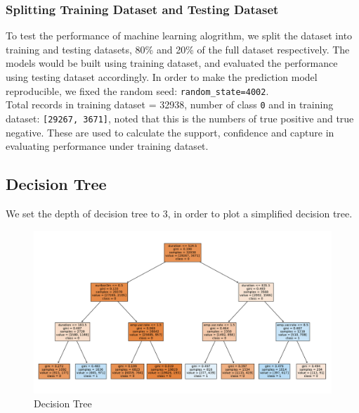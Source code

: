 \documentclass[11pt,a4paper]{article}
\begin{document}
    \subsubsection{Splitting Training Dataset and Testing Dataset}
    To test the performance of machine learning alogrithm, we split the dataset into training and testing datasets, 80\% and 20\% of the full dataset respectively. The models would be built using training dataset, and evaluated the performance using testing dataset accordingly. In order to make the prediction model reproducible, we fixed the random seed: \texttt{random\_state=4002}. \\
    Total records in training dataset = 32938, number of class \texttt{0} and  in training dataset: \texttt{[29267, 3671]}, noted that this is the numbers of true positive and true negative. These are used to calculate the support, confidence and capture in evaluating performance under training dataset.
    
    
    \newpage
    \subsection{Decision Tree} \label{decision_trees}
    We set the depth of decision tree to 3, in order to plot a simplified decision tree.

    \begin{figure}[ht]
        \centering
        \includegraphics[width=\textwidth]{plot/classification/decision_tree.pdf}
        \caption{Decision Tree}
        \label{fig:decision_tree}
    \end{figure}
\end{document}
